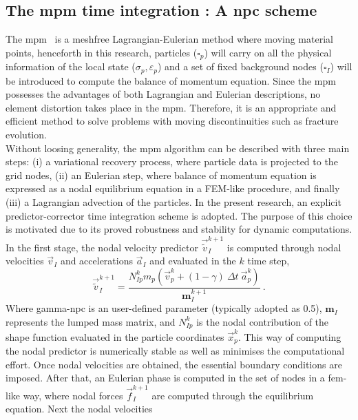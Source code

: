 \documentclass[preprint,12pt,a4paper]{elsarticle}
\newcommand{\tens}[1]{
  \ensuremath{\mathbf{{#1}}}
}
\begin{document}
\subsection{The \acrshort{mpm} time integration : A \acrlong{npc}  scheme}
\label{sec:2.1}
The \acrshort{mpm}~\cite{Sulsky1994} is a meshfree Lagrangian-Eulerian
method where moving material points, henceforth in this research,
particles ($\square_p$) will carry on all the physical information of the local state ($\sigma_p,
\varepsilon_p$) and a set of fixed background nodes ($\square_I$) will
be introduced to compute the balance of momentum equation. Since the
\acrshort{mpm} possesses the advantages of both Lagrangian and
Eulerian descriptions, no element distortion takes place in the
\acrshort{mpm}. Therefore, it is an appropriate and efficient method
to solve problems with moving discontinuities such as fracture evolution.\\
Without loosing generality, the \acrshort{mpm} algorithm
can be described with three main steps: (i) a variational recovery
process, where particle data is projected to the grid nodes, (ii) an
Eulerian step, where balance of momentum equation is expressed as a
nodal equilibrium equation in a FEM-like procedure, and finally
(iii) a Lagrangian advection of the particles. In the present research,
an explicit predictor-corrector time integration scheme is adopted. The
purpose of this choice is motivated due to its proved robustness and
stability for dynamic computations. In the first stage, the nodal
velocity predictor $ \vec{\tilde{v}}_I^{k+1}$ is computed through
nodal velocities $\vec{v}_I$ and accelerations $\vec{a}_I$ and evaluated
in the $k$ time step,
\begin{equation}
  \label{eq:Predictor-velocity}
  \vec{\tilde{v}}_I^{k+1} = \frac{N_{Ip}^{k} m_p (\vec{v}_p^k + (1 - \gamma)\ \Delta t\ \vec{a}_p^k)}{\tens{m}_I^{k+1}}\ .
\end{equation}
Where \gls{gamma-npc} is an user-defined parameter (typically adopted as
0.5), $\tens{m}_I$ represents the lumped mass matrix, and $N_{Ip}^{k}$ is
the nodal contribution of the shape function evaluated in the particle
coordinates $\vec{x}_p^k$. This way of computing the nodal predictor is numerically stable
as well as minimises the computational effort. Once nodal velocities are
obtained, the essential boundary conditions are imposed. After that, an
Eulerian phase is computed in the set of nodes in a
\acrshort{fem}-like way, where nodal forces $\vec{f}_{I}^{k+1}$ are
computed through the equilibrium equation. Next the nodal velocities
\end{document}
